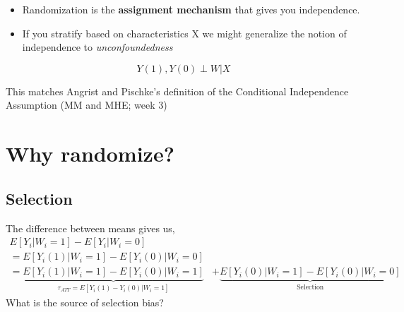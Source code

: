 \documentclass[
  letterpaper,
  DIV=11,
  numbers=noendperiod]{scrreprt}
\providecommand{\tightlist}{%
  \setlength{\itemsep}{0pt}\setlength{\parskip}{0pt}}\usepackage{longtable,booktabs,array}
\theoremstyle{definition}
\theoremstyle{remark}
\begin{document}
\begin{itemize}
\tightlist
\item
  Randomization is the \textbf{assignment mechanism} that gives you
  independence.
\item
  If you stratify based on characteristics X we might generalize the
  notion of independence to \emph{unconfoundedness}
\end{itemize}

\begin{tcolorbox}[enhanced jigsaw, breakable, colframe=quarto-callout-note-color-frame, toptitle=1mm, toprule=.15mm, opacitybacktitle=0.6, opacityback=0, rightrule=.15mm, titlerule=0mm, colback=white, bottomtitle=1mm, title={Def. Unconfounded Assignmet (Version 2)}, arc=.35mm, coltitle=black, colbacktitle=quarto-callout-note-color!10!white, leftrule=.75mm, bottomrule=.15mm, left=2mm]

\[
Y(1),Y(0) \perp W|X
\]

\end{tcolorbox}

This matches Angrist and Pischke's definition of the Conditional
Independence Assumption (MM and MHE; week 3)

\hypertarget{why-randomize}{%
\section{Why randomize?}\label{why-randomize}}

\hypertarget{selection}{%
\subsection{Selection}\label{selection}}

The difference between means gives us, \[
\begin{aligned}
E[Y_i|W_i=1] - E[Y_i|W_i=0]\\
=E[Y_i(1)|W_i=1]- E[Y_i(0)|W_i=0] \\
=\underbrace{E[Y_i(1)|W_i=1]-E[Y_i(0)|W_i=1]}_{\tau_{ATT}=E[Y_i(1)-Y_i(0)|W_i=1]} & + \underbrace{E[Y_i(0)|W_i=1]- E[Y_i(0)|W_i=0]}_{\text{Selection}}
\end{aligned}
\] What is the source of selection bias?

\par
\end{document}
